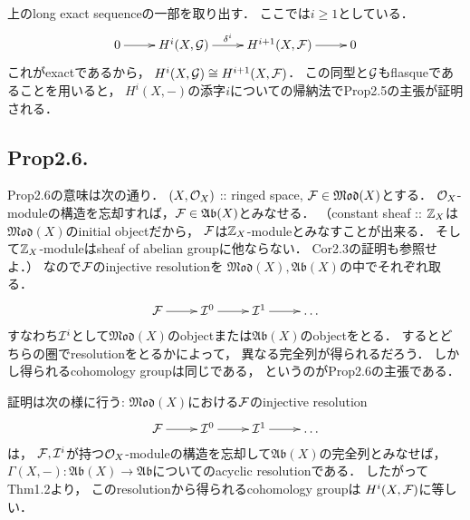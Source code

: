 \documentclass[]{jsarticle}
\newcommand{\catMod}{\mathfrak{Mod}}
\newcommand{\catAb}{\mathfrak{Ab}}
\begin{document}
    上のlong exact sequenceの一部を取り出す．
    ここでは$i \geq 1$としている．
    \[\xymatrix{ 0 \ar[r]& H^i(X, \shG) \ar[r]^-{\delta^i} & H^{i+1}(X, \shF) \ar[r]& 0 }\]
    これがexactであるから，
    $H^i(X, \mathcal{G}) \cong H^{i+1}(X, \mathcal{F})$．
    この同型と$\mathcal{G}$もflasqueであることを用いると，
    $H^i(X,-)$の添字$i$についての帰納法でProp2.5の主張が証明される．

\subsection{Prop2.6.}
    Prop2.6の意味は次の通り．
    $(X, \mathcal{O}_X)$ :: ringed space,
    $\shF \in \catMod(X)$とする．
    $\mathcal{O}_X$-moduleの構造を忘却すれば，$\shF \in \catAb(X)$とみなせる．
    （constant sheaf :: $\mathbb{Z}_X$は$\catMod(X)$のinitial objectだから，
    $\mathcal{F}$は$\mathbb{Z}_X$-moduleとみなすことが出来る．
    そして$\mathbb{Z}_X$-moduleはsheaf of abelian groupに他ならない．
    Cor2.3の証明も参照せよ．）
    なので$\mathcal{F}$のinjective resolutionを
    $\catMod(X), \catAb(X)$の中でそれぞれ取る．
    \[
    \xymatrix{ \shF \ar[r]& \shI^0 \ar[r]& \shI^1 \ar[r]& \dots }
    \]
    すなわち$\mathcal{I}^i$として$\catMod(X)$のobjectまたは$\catAb(X)$のobjectをとる．
    するとどちらの圏でresolutionをとるかによって，
    異なる完全列が得られるだろう．
    しかし得られるcohomology groupは同じである，
    というのがProp2.6の主張である．

    証明は次の様に行う:
    $\catMod(X)$における$\mathcal{F}$のinjective resolution
    \[
    \xymatrix{ \shF \ar[r]& \shI^0 \ar[r]& \shI^1 \ar[r]& \dots }
    \]
    は，
    $\mathcal{F}, \mathcal{I}^i$が持つ$\mathcal{O}_X$-moduleの構造を忘却して$\catAb(X)$の完全列とみなせば，
    $\Gamma(X, -): \catAb(X) \to \catAb$についてのacyclic resolutionである．
    したがってThm1.2より，
    このresolutionから得られるcohomology groupは
    $H^i(X, \mathcal{F})$に等しい．
\end{document}

